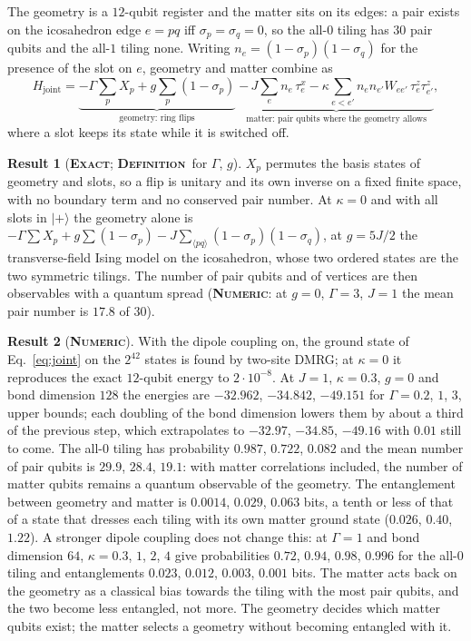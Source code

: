 \documentclass[11pt]{article}
\newcommand{\exact}{\textbf{\textsc{Exact}}}
\newcommand{\numeric}{\textbf{\textsc{Numeric}}}
\newcommand{\defn}{\textbf{\textsc{Definition}}}
\theoremstyle{definition}
\newtheorem{result}{Result}
\begin{document}
The geometry is a $12$-qubit register and the matter sits on its edges: a pair exists on the icosahedron edge $e=pq$ iff $\sigma_p=\sigma_q=0$, so the all-$0$ tiling has $30$ pair qubits and the all-$1$ tiling none. Writing $n_e=(1-\sigma_p)(1-\sigma_q)$ for the presence of the slot on $e$, geometry and matter combine as
\begin{equation}\label{eq:joint}
H_{\mathrm{joint}}=\underbrace{-\Gamma\sum_pX_p+g\sum_p(1-\sigma_p)}_{\text{geometry: ring flips}}\;\underbrace{-\,J\sum_en_e\,\tau^x_e-\kappa\sum_{e<e'}n_en_{e'}W_{ee'}\,\tau^z_e\tau^z_{e'}}_{\text{matter: pair qubits where the geometry allows}} ,
\end{equation}
where a slot keeps its state while it is switched off.
\begin{result}[\exact; \defn\ for $\Gamma$, $g$]\label{res:joint}
$X_p$ permutes the basis states of geometry and slots, so a flip is unitary and its own inverse on a fixed finite space, with no boundary term and no conserved pair number. At $\kappa=0$ and with all slots in $|+\rangle$ the geometry alone is $-\Gamma\sum X_p+g\sum(1-\sigma_p)-J\sum_{\langle pq\rangle}(1-\sigma_p)(1-\sigma_q)$, at $g=5J/2$ the transverse-field Ising model on the icosahedron, whose two ordered states are the two symmetric tilings. The number of pair qubits and of vertices are then observables with a quantum spread (\numeric: at $g=0$, $\Gamma=3$, $J=1$ the mean pair number is $17.8$ of $30$).
\end{result}
\begin{result}[\numeric]\label{res:dmrg}
With the dipole coupling on, the ground state of Eq.~\eqref{eq:joint} on the $2^{42}$ states is found by two-site DMRG; at $\kappa=0$ it reproduces the exact $12$-qubit energy to $2\cdot10^{-8}$. At $J=1$, $\kappa=0.3$, $g=0$ and bond dimension $128$ the energies are $-32.962$, $-34.842$, $-49.151$ for $\Gamma=0.2$, $1$, $3$, upper bounds; each doubling of the bond dimension lowers them by about a third of the previous step, which extrapolates to $-32.97$, $-34.85$, $-49.16$ with $0.01$ still to come. The all-$0$ tiling has probability $0.987$, $0.722$, $0.082$ and the mean number of pair qubits is $29.9$, $28.4$, $19.1$: with matter correlations included, the number of matter qubits remains a quantum observable of the geometry. The entanglement between geometry and matter is $0.0014$, $0.029$, $0.063$ bits, a tenth or less of that of a state that dresses each tiling with its own matter ground state ($0.026$, $0.40$, $1.22$). A stronger dipole coupling does not change this: at $\Gamma=1$ and bond dimension $64$, $\kappa=0.3$, $1$, $2$, $4$ give probabilities $0.72$, $0.94$, $0.98$, $0.996$ for the all-$0$ tiling and entanglements $0.023$, $0.012$, $0.003$, $0.001$ bits. The matter acts back on the geometry as a classical bias towards the tiling with the most pair qubits, and the two become less entangled, not more. The geometry decides which matter qubits exist; the matter selects a geometry without becoming entangled with it.
\end{result}
\end{document}
